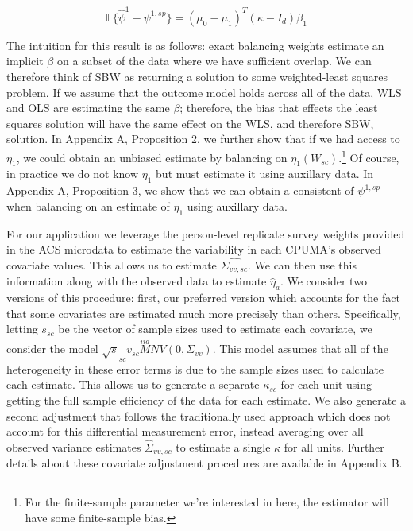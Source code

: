 \documentclass[aoas]{imsart}
\theoremstyle{plain}
\theoremstyle{remark}
\begin{document}
\begin{equation}
\mathbb{E}\{\hat{\psi}^{1} - \psi^{1, sp}\} = (\mu_0 - \mu_1)^T(\kappa - I_d)\beta_1
\end{equation}

The intuition for this result is as follows: exact balancing weights estimate an implicit $\beta$ on a subset of the data where we have sufficient overlap. We can therefore think of SBW as returning a solution to some weighted-least squares problem. If we assume that the outcome model holds across all of the data, WLS and OLS are estimating the same $\beta$; therefore, the bias that effects the least squares solution will have the same effect on the WLS, and therefore SBW, solution. In Appendix A, Proposition 2, we further show that if we had access to $\eta_1$, we could obtain an unbiased estimate by balancing on $\eta_1(W_{sc})$.\footnote{For the finite-sample parameter we're interested in here, the estimator will have some finite-sample bias.} Of course, in practice we do not know $\eta_1$ but must estimate it using auxillary data. In Appendix A, Proposition 3, we show that we can obtain a consistent of $\psi^{1, sp}$ when balancing on an estimate of $\eta_1$ using auxillary data. 

For our application we leverage the person-level replicate survey weights provided in the ACS microdata to estimate the variability in each CPUMA's observed covariate values. This allows us to estimate $\hat{\Sigma_{vv, sc}}$. We can then use this information along with the observed data to estimate $\hat{\eta}_a$. We consider two versions of this procedure: first, our preferred version which accounts for the fact that some covariates are estimated much more precisely than others. Specifically, letting $s_{sc}$ be the vector of sample sizes used to estimate each covariate, we consider the model $\sqrt{s}_{sc}v_{sc} \stackrel{iid}MNV(0, \Sigma_{vv})$. This model assumes that all of the heterogeneity in these error terms is due to the sample sizes used to calculate each estimate. This allows us to generate a separate $\kappa_{sc}$ for each unit using getting the full sample efficiency of the data for each estimate. We also generate a second adjustment that follows the traditionally used approach which does not account for this differential measurement error, instead averaging over all observed variance estimates $\hat{\Sigma}_{vv, sc}$ to estimate a single $\kappa$ for all units. Further details about these covariate adjustment procedures are available in Appendix B.
\end{document}
